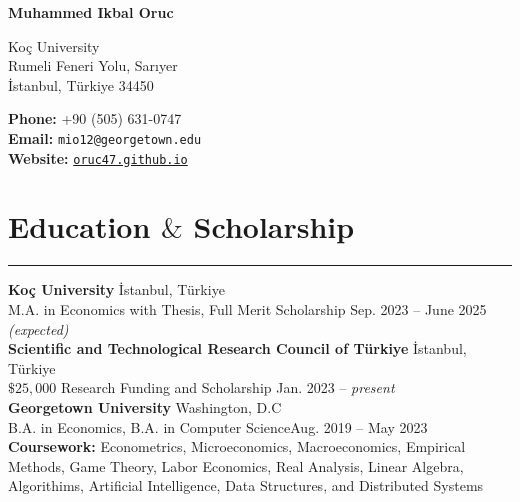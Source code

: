 \documentclass[a4paper,10pt]{article}
\newcommand{\HRule}{\rule{\linewidth}{0.5mm}}
\begin{document}
{\LARGE \textbf{Muhammed Ikbal Oruc}}
\vspace{10pt}

\noindent
\begin{spacing}{2}
    \begin{minipage}[t]{0.5\textwidth} %
        Koç University \\
        Rumeli Feneri Yolu, Sarıyer\\
        İstanbul, Türkiye 34450
    \end{minipage}%
    \begin{minipage}[t]{0.5\textwidth} %
        \raggedleft %
        \textbf{Phone:} +90 (505) 631-0747 \\
        \textbf{Email:} \texttt{mio12@georgetown.edu} \\
        \textbf{Website:} \href{https://oruc47.github.io}{\texttt{oruc47.github.io}}\\
    \end{minipage}
\end{spacing}

\vspace{-10pt}



\section*{Education $\&$ Scholarship}
\vspace{-15pt}
\HRule

\textbf{Koç University} \hfill İstanbul, Türkiye\\
M.A. in Economics with Thesis, Full Merit Scholarship \hfill Sep. 2023 – June 2025 \emph{(expected)}\\[5pt]

\textbf{Scientific and Technological Research Council of Türkiye} \hfill İstanbul, Türkiye\\
$\$25,000$ Research Funding and Scholarship \hfill Jan. 2023 – \emph{present}\\[5pt]


\textbf{Georgetown University} \hfill Washington, D.C \\
B.A. in Economics, B.A. in Computer Science\hfill Aug. 2019 – May 2023 \\[5pt]

\textbf{Coursework:} Econometrics, Microeconomics, 
Macroeconomics, Empirical Methods, Game Theory, Labor Economics,
Real Analysis, Linear Algebra, Algorithims, Artificial 
Intelligence, Data Structures, and Distributed Systems
\end{document}
